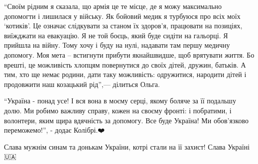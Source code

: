 
\enquote{Своїм рідним я сказала, що армія це те місце, де я можу максимально допомогти
і лишилася у війську. Як бойовий медик я турбуюся про всіх моїх \enquote{котиків}. Це
означає слідкувати за станом їх здоров'я, працювати на позиціях, виїжджати на
евакуацію. Я не той боєць, який буде сидіти на гальорці. Я прийшла на війну.
Тому хочу і буду на нулі, надавати там першу медичну допомогу. Моя мета –
встигнути прибути якнайшвидше, щоб врятувати життя. Бо врешті, це можливість
хлопцям повернутися до своїх дітей, дружин, батьків. А тим, хто ще немає
родини, дати таку можливість: одружитися, народити дітей і продовжити наш
козацький рід},— ділиться Ольга.🙏🏻


\enquote{Україна - понад усе! І вся вона в моєму серці, якому боляче за її подальшу
долю. Ми робимо важливу справу, кожен на своєму фронті: і побратими, і
волонтери, яким щира вдячність за допомогу. Все буде Україна! Ми обов'язково
переможемо!}, - додає Колібрі.❤️

Слава мужнім синам та донькам України, котрі стали на її захист! Слава
Україні🇺🇦



